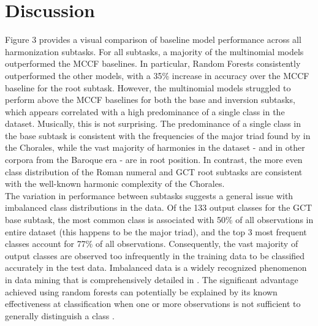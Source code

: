 \documentclass[11pt]{article}
\begin{document}
\section{Discussion}

Figure 3 provides a visual comparison of baseline model performance across all harmonization subtasks. For all subtasks, a majority of the multinomial models outperformed the MCCF baselines. In particular, Random Forests consistently outperformed the other models, with a 35\% increase in accuracy over the MCCF baseline for the root subtask. However, the multinomial models struggled to perform above the MCCF baselines  for both the base and inversion subtasks, which appears correlated with a high predominance of a single class in the dataset. Musically, this is not surprising. The predominance of a single class in the base subtask is consistent with the frequencies of the major triad found by \citet{cross2008} in the Chorales, while the vast majority of harmonies in the dataset - and in other corpora from the Baroque era - are in root position. In contrast, the more even class distribution of the Roman numeral and GCT root subtasks are consistent with the well-known harmonic complexity of the Chorales. \\

The variation in performance between subtasks suggests a general issue with imbalanced class distributions in the data. Of the 133 output classes for the GCT base subtask, the most common class is associated with 50\% of all observations in entire dataset (this happens to be the major triad), and the top 3 most frequent classes account for 77\% of all observations. Consequently, the vast majority of output classes are observed too infrequently in the training data to be classified accurately in the test data. Imbalanced data is a widely recognized phenomenon in data mining that is comprehensively detailed in \citet{sun2009classification}. The significant advantage achieved using random forests can potentially be explained by its known effectiveness at classification when one or more observations is not sufficient to generally distinguish a class \citep[pg.~18]{breiman2001}.

\newpage
\printbibliography
\end{document}
